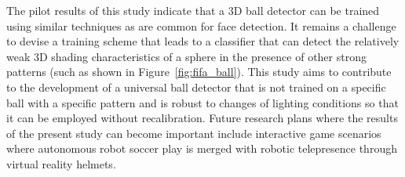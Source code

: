 \documentclass{sig-alternate-05-2015}
\begin{document}
{    The pilot results of this study indicate that a 3D ball detector can be trained using similar techniques as are common for face detection. It remains a challenge to devise a training scheme that leads to a classifier that can detect the relatively weak 3D shading characteristics of a sphere in the presence of other strong patterns (such as shown in Figure~\ref{fig:fifa_ball}). This study aims to contribute to the development of a universal ball detector that is not trained on a specific ball with a specific pattern and is robust to changes of lighting conditions so that it can be employed without recalibration. Future research plans where the results of the present study can become important include interactive game scenarios where autonomous robot soccer play is merged with robotic telepresence through virtual reality helmets.
}

\balance

	
\end{document}
